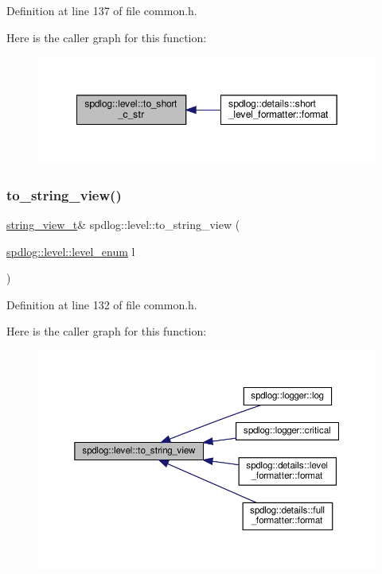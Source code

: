 Definition at line 137 of file common.\+h.

Here is the caller graph for this function\+:
\nopagebreak
\begin{figure}[H]
\begin{center}
\leavevmode
\includegraphics[width=349pt]{namespacespdlog_1_1level_ac33524043deb648efa6d0a83bdcaeabc_icgraph}
\end{center}
\end{figure}
\mbox{\label{namespacespdlog_1_1level_a95af114ec4b98530113f98b5c7bc5ec7}} 
\subsubsection{\texorpdfstring{to\+\_\+string\+\_\+view()}{to\_string\_view()}}
{\footnotesize\ttfamily \hyperlink{namespacespdlog_af48e310b2f366ac6544701e6a3b56247}{string\+\_\+view\+\_\+t}\& spdlog\+::level\+::to\+\_\+string\+\_\+view (\begin{DoxyParamCaption}\item[{\hyperlink{namespacespdlog_1_1level_a35f5227e5daf228d28a207b7b2aefc8b}{spdlog\+::level\+::level\+\_\+enum}}]{l }\end{DoxyParamCaption})\hspace{0.3cm}{\ttfamily [inline]}}



Definition at line 132 of file common.\+h.

Here is the caller graph for this function\+:
\nopagebreak
\begin{figure}[H]
\begin{center}
\leavevmode
\includegraphics[width=350pt]{namespacespdlog_1_1level_a95af114ec4b98530113f98b5c7bc5ec7_icgraph}
\end{center}
\end{figure}
